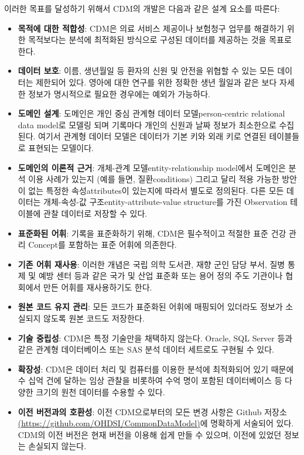 \documentclass[11pt]{book}
\providecommand{\tightlist}{%
  \setlength{\itemsep}{0pt}\setlength{\parskip}{0pt}}
\theoremstyle{definition}
\theoremstyle{definition}
\theoremstyle{definition}
\theoremstyle{remark}
\begin{document}
이러한 목표를 달성하기 위해서 CDM의 개발은 다음과 같은 설계 요소를
따른다:

\begin{itemize}
\tightlist
\item
  \textbf{목적에 대한 적합성}: CDM은 의료 서비스 제공이나 보험청구
  업무를 해결하기 위한 목적보다는 분석에 최적화된 방식으로 구성된
  데이터를 제공하는 것을 목표로 한다.
\item
  \textbf{데이터 보호}: 이름, 생년월일 등 환자의 신원 및 안전을 위협할
  수 있는 모든 데이터는 제한되어 있다. 영아에 대한 연구를 위한 정확한
  생년 월일과 같은 보다 자세한 정보가 명시적으로 필요한 경우에는 예외가
  가능하다.
\item
  \textbf{도메인 설계}: 도메인은 개인 중심 관계형 데이터
  모델person-centric relational data model로 모델링 되며 기록마다 개인의
  신원과 날짜 정보가 최소한으로 수집된다. 여기서 관계형 데이터 모델은
  데이터가 기본 키와 외래 키로 연결된 테이블들로 표현되는 모델이다.
\item
  \textbf{도메인의 이론적 근거}: 개체-관계 모델entity-relationship
  model에서 도메인은 분석 이용 사례가 있는지 (예를 들면, 질환conditions)
  그리고 달리 적용 가능한 방안이 없는 특정한 속성attributes이 있는지에
  따라서 별도로 정의된다. 다른 모든 데이터는 개체-속성-값
  구조entity-attribute-value structure를 가진 Observation 테이블에 관찰
  데이터로 저장할 수 있다. 
\item
  \textbf{표준화된 어휘}: 기록을 표준화하기 위해, CDM은 필수적이고
  적절한 표준 건강 관리 Concept를 포함하는 표준 어휘에 의존한다.
\item
  \textbf{기존 어휘 재사용}: 이러한 개념은 국립 의학 도서관, 재향 군인
  담당 부서, 질병 통제 및 예방 센터 등과 같은 국가 및 산업 표준화 또는
  용어 정의 주도 기관이나 협회에서 만든 어휘를 재사용하기도 한다.
\item
  \textbf{원본 코드 유지 관리}: 모든 코드가 표준화된 어휘에 매핑되어
  있더라도 정보가 소실되지 않도록 원본 코드도 저장한다.
\item
  \textbf{기술 중립성}: CDM은 특정 기술만을 채택하지 않는다. Oracle, SQL
  Server 등과 같은 관계형 데이터베이스 또는 SAS 분석 데이터 세트로도
  구현될 수 있다. 
\item
  \textbf{확장성}: CDM은 데이터 처리 및 컴퓨터를 이용한 분석에
  최적화되어 있기 때문에 수 십억 건에 달하는 임상 관찰을 비롯하여 수억
  명이 포함된 데이터베이스 등 다양한 크기의 원천 데이터를 수용할 수
  있다. 
\item
  \textbf{이전 버전과의 호환성}: 이전 CDM으로부터의 모든 변경 사항은
  Github 저장소
  \href{https://github.com/OHDSI/CommonDataModel}{(https://github.com/OHDSI/CommonDataModel)}에
  명확하게 서술되어 있다. CDM의 이전 버전은 현재 버전을 이용해 쉽게 만들
  수 있으며, 이전에 있었던 정보는 손실되지 않는다.
\end{itemize}
\end{document}
